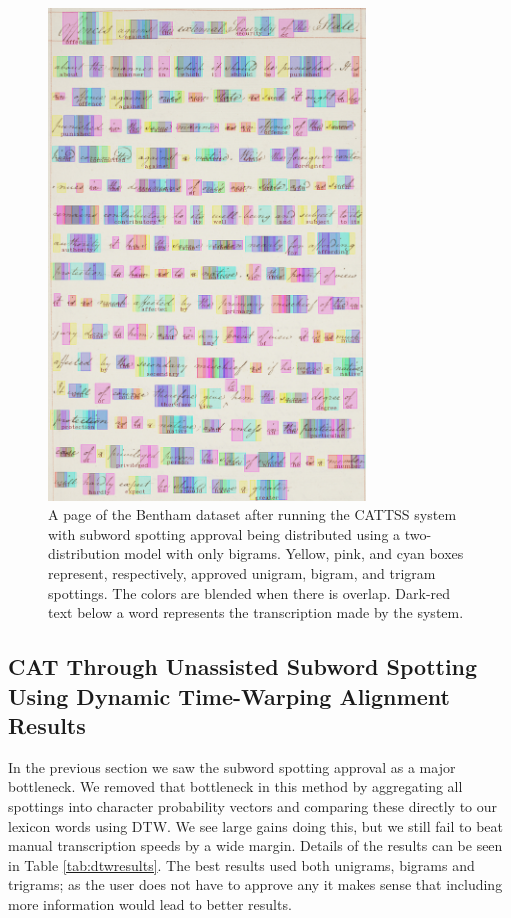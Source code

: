 \documentclass[ms,electronic,twosidetoc,letterpaper,chaptercenter,parttop,lof,lot]{byumsphd}
\begin{document}
\begin{figure}
    \centering
    \includegraphics[width=0.75\textwidth]{aftercattss}
    \caption{A page of the Bentham dataset after running the CATTSS system with subword spotting approval being distributed using a two-distribution model with only bigrams. Yellow, pink, and cyan boxes represent, respectively, approved unigram, bigram, and trigram spottings. The colors are blended when there is overlap. Dark-red text below a word represents the transcription made by the system.}
    \label{fig:aftercattss}
\end{figure}




\subsection{CAT Through Unassisted Subword Spotting Using Dynamic Time-Warping Alignment Results}

In the previous section we saw the subword spotting approval as a major bottleneck. We removed that bottleneck in this method by aggregating all spottings into character probability vectors and comparing these directly to our lexicon words using DTW. We see large gains doing this, but we still fail to beat manual transcription speeds by a wide margin. Details of the results can be seen in Table \ref{tab:dtwresults}. The best results used both unigrams, bigrams and trigrams; as the user does not have to approve any it makes sense that including more information would lead to better results.
\end{document}
